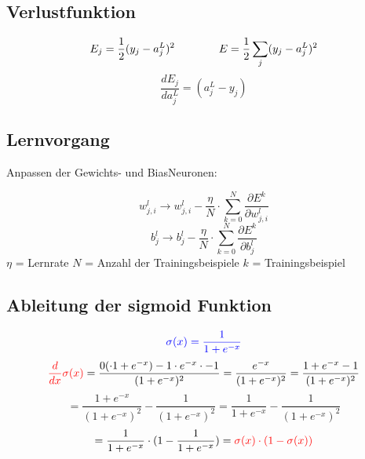 \documentclass{article}
\begin{document}
\subsection{Verlustfunktion}
\[ E_j = \frac{1}{2}(y_j - a_j^L)^2 
\kern 40pt
 E = \frac{1}{2}\sum_{j}^{} (y_j - a_j^L)^2 \]
\[ \frac{dE_j}{da_{j}^L}  = (a_j^L - y_j) \]


\subsection{Lernvorgang}
Anpassen der Gewichts- und BiasNeuronen:

\[ w_{j,i}^l \rightarrow w_{j,i}^l - \frac{\eta}{N} \cdot \sum_{k = 0}^{N} \frac{\partial E^k}{\partial w_{j,i}^l} \]
\[ b_j^l \rightarrow b_j^l - \frac{\eta}{N} \cdot \sum_{k = 0}^{N} \frac{\partial E^k}{\partial b_j^l} \]
$\eta$ = Lernrate \kern 20pt $N$ = Anzahl der Trainingsbeispiele \kern 20pt $k$ = Trainingsbeispiel 


\subsection{Ableitung der sigmoid Funktion}
\[ \textcolor{blue}{ \sigma(x) = \frac{1}{1 + e^{-x}} } \]
\[ \textcolor{red}{ \frac{d}{dx}\sigma(x) } = \frac{
0( \cdot 1 + e^{-x}) - 1 \cdot e^{-x} \cdot -1
}{
    (1 + e^{-x})^2
} = \frac{e^{-x}}{(1 + e^{-x})^2} 
= \frac{1 + e^{-x} - 1}{(1 + e^{-x})^2} \]
\[ =\frac{1 + e^{-x}}{(1 + e^{-x})^2} - \frac{1}{(1 + e^{-x})^2} 
= \frac{1}{1 + e^{-x}} - \frac{1}{(1 + e^{-x})^2} \]
\[ = \frac{1}{1 + e^{-x}} \cdot (1 - \frac{1}{1 + e^{-x}}) 
= \textcolor{red}{ \sigma(x) \cdot (1 - \sigma(x)) } \]


\pagebreak
\end{document}
